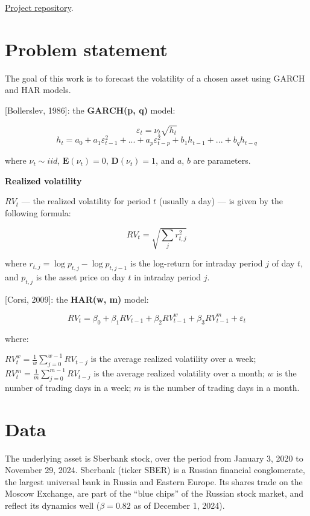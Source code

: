 \documentclass[]{article}
\begin{document}
{
	\Large
	\href{https://github.com/MaximKiryakin/quant-finance-projects/tree/main/volatility-har-garch}{Project repository}.
}

\section{Problem statement}


The goal of this work is to forecast the volatility of a chosen asset using GARCH and HAR models.

[Bollerslev, 1986]: the \textbf{GARCH(p, q)} model:

$$\varepsilon_t = \nu_t \sqrt{h_t}$$
$$h_t = a_0 + a_1\varepsilon_{t-1}^2 + ... + a_p\varepsilon_{t-p}^2 + b_1 h_{t-1} + ... + b_q h_{t-q}$$

where $\nu_t \sim iid$, $\mathbf{E}(\nu_t) = 0$, $\mathbf{D}(\nu_t) = 1$, and $a$, $b$ are parameters.

\textbf{Realized volatility}

$RV_t$ --- the realized volatility for period $t$ (usually a day) --- is given by the following formula:

$$RV_{t} = \sqrt{\sum_{j}r_{t, j}^2}$$


where $r_{t, j} = \log{p_{t, j}} - \log{p_{t, j-1}}$ is the log-return for intraday period $j$ of day $t$, and $p_{t, j}$ is the asset price on day $t$ in intraday period $j$.


[Corsi, 2009]: the \textbf{HAR(w, m)} model:

$$RV_t = \beta_0 + \beta_1 RV_{t-1} + \beta_2 RV_{t-1}^w + \beta_3 RV_{t-1}^m + \varepsilon_t$$

where:

$RV_{t}^w = \frac{1}{w}\sum_{j=0}^{w-1}RV_{t-j}$ is the average realized volatility over a week;
$RV_{t}^m = \frac{1}{m}\sum_{j=0}^{m-1}RV_{t-j}$ is the average realized volatility over a month; $w$ is the number of trading days in a week; $m$ is the number of trading days in a month.



\section{Data}


The underlying asset is Sberbank stock, over the period from January 3, 2020 to November 29, 2024. Sberbank (ticker SBER) is a Russian financial conglomerate, the largest universal bank in Russia and Eastern Europe. Its shares trade on the Moscow Exchange, are part of the ``blue chips'' of the Russian stock market, and reflect its dynamics well ($\beta = 0.82$ as of December 1, 2024).
\end{document}
